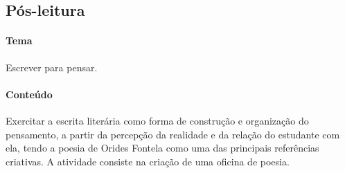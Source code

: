\documentclass[12pt]{extarticle}
\begin{document}
\subsection{Pós-leitura}

%
%
%
%

\paragraph{Tema} Escrever para pensar.

\paragraph{Conteúdo} Exercitar a escrita literária como forma de
construção e organização do pensamento, a partir da percepção da
realidade e da relação do estudante com ela, tendo a poesia de Orides
Fontela como uma das principais referências criativas. A atividade
consiste na criação de uma oficina de poesia.
\end{document}
